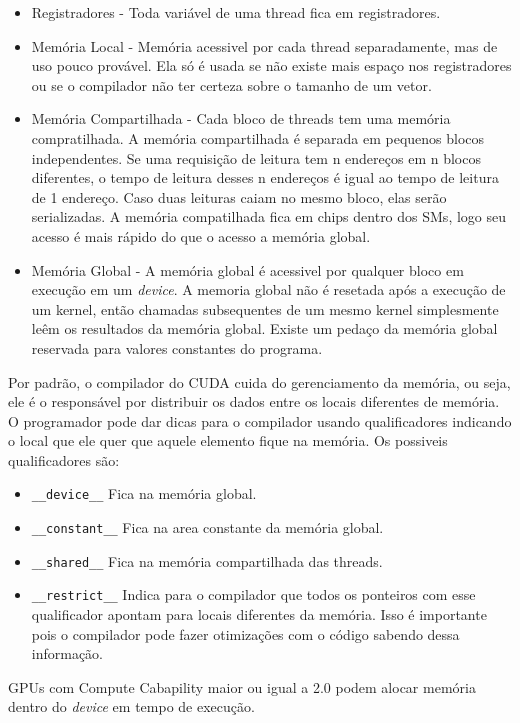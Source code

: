 \begin{itemize}
  \item Registradores - Toda variável de uma thread fica em registradores.
  \item Memória Local - Memória acessivel por cada thread separadamente, mas de uso pouco provável. Ela só é usada se
          não existe mais espaço nos registradores ou se o compilador não ter certeza sobre o tamanho de um vetor.
  \item Memória Compartilhada - Cada bloco de threads tem uma memória compratilhada. A memória compartilhada é separada em
          pequenos blocos independentes. Se uma requisição de leitura tem n endereços em n blocos diferentes, o tempo de leitura
          desses n endereços é igual ao tempo de leitura de 1 endereço. Caso duas leituras caiam no mesmo bloco, elas serão
          serializadas. A memória compatilhada fica em chips dentro dos SMs, logo seu acesso é mais rápido do que o acesso a
          memória global.
  \item Memória Global - A memória global é acessivel por qualquer bloco em execução em um \textit{device}. A memoria global não é
          resetada após a execução de um kernel, então chamadas subsequentes de um mesmo kernel simplesmente leêm os resultados
          da memória global. Existe um pedaço da memória global reservada para valores constantes do programa.
\end{itemize}

Por padrão, o compilador do CUDA cuida do gerenciamento da memória, ou seja, ele é o responsável por distribuir os dados 
entre os locais diferentes de memória. O programador pode dar dicas para o compilador usando qualificadores indicando o local
que ele quer que aquele elemento fique na memória. Os possiveis qualificadores são:
\begin{itemize}
  \item \verb#__device__# Fica na memória global.
  \item \verb#__constant__#   Fica na area constante da memória global.
  \item \verb#__shared__# Fica na memória compartilhada das threads.
  \item \verb#__restrict__# Indica para o compilador que todos os ponteiros com esse qualificador apontam para locais diferentes
                            da memória. Isso é importante pois o compilador pode fazer otimizações com o código sabendo dessa informação.   
\end{itemize}

GPUs com Compute Cabapility maior ou igual a 2.0 podem alocar memória dentro do \textit{device} em tempo de execução.
